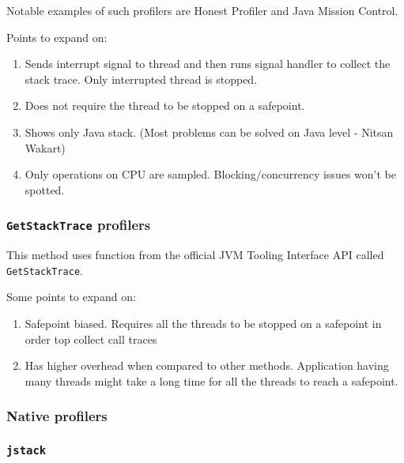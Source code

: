 \documentclass[..thesis.tex]{subfiles}
\begin{document}
Notable examples of such profilers are Honest Profiler and Java Mission Control. 


Points to expand on:
\begin{enumerate}
	\item Sends interrupt signal to thread and then runs signal handler to collect the stack trace. Only interrupted thread is stopped.
	\item Does not require the thread to be stopped on a safepoint.
	\item Shows only Java stack. (Most problems can be solved on Java level - Nitsan Wakart)
	\item Only operations on CPU are sampled. Blocking/concurrency issues won't be spotted.
\end{enumerate}



\subsubsection{\texttt{GetStackTrace} profilers}
This method uses function from the official JVM Tooling Interface API \cite{jvmti_doc} called \texttt{GetStackTrace}.

Some points to expand on:
\begin{enumerate}
	\item Safepoint biased. Requires all the threads to be stopped on a safepoint in order top collect call traces
	\item Has higher overhead when compared to other methods. Application having many threads might take a long time for all the threads to reach a safepoint.
\end{enumerate}

\subsubsection{Native profilers}
\subsubsection{\texttt{jstack}}
\end{document}

